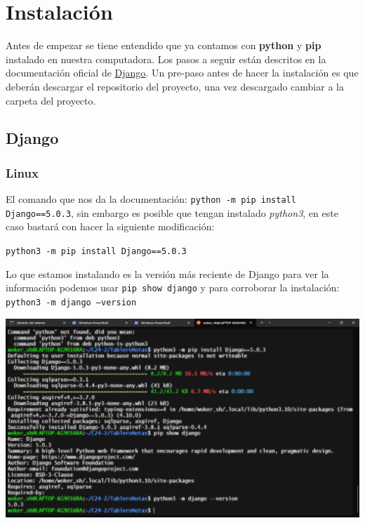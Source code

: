 \section{Instalación}

Antes de empezar se tiene entendido que ya contamos con \textbf{python} y \textbf{pip} instalado en nuestra computadora. Los pasos a seguir están descritos en la documentación oficial de \href{https://www.djangoproject.com/}{\underline{Django}}. Un pre-paso antes de hacer la instalación es que deberán descargar el repositorio del proyecto, una vez descargado cambiar a la carpeta del proyecto.

\subsection{Django}

\subsubsection*{Linux}

El comando que nos da la documentación: \texttt{python -m pip install Django==5.0.3}, sin embargo es posible que tengan instalado \textit{python3}, en este caso bastará con hacer la siguiente modificación: 
\begin{center}
    \texttt{python3 -m pip install Django==5.0.3}    
\end{center}
Lo que estamos instalando es la versión más reciente de Django para ver la información podemos usar \texttt{pip show django} y para corroborar la instalación: \texttt{python3 -m django --version}

\begin{center}
    \includegraphics[scale = .35]{IMA/djangoLinux.png}
\end{center}

